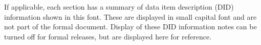 

If applicable, each section has a summary of data item description (DID) information shown in this font.
These are displayed in small capital font and are not part of the formal document.
Display of these DID information notes can be turned off for formal releases, but are displayed here for reference.
